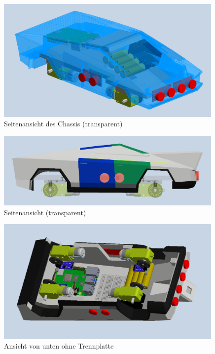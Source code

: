 \newpage

\begin{figure}[h]
    \centering
    \includegraphics[width=0.99\textwidth]{Resources/seitlich_chassi_transparent.png}
    \caption{Seitenansicht des Chassis (transparent)}
\end{figure}

\begin{figure}[h]
    \centering
    \includegraphics[width=0.99\textwidth]{Resources/seitlich_transparent.png}
    \caption{Seitenansicht (transparent)}
\end{figure}

\newpage

\begin{figure}[h]
    \centering
    \includegraphics[width=0.99\textwidth]{Resources/unten_ohne_trennplatte.png}
    \caption{Ansicht von unten ohne Trennplatte}
\end{figure}

